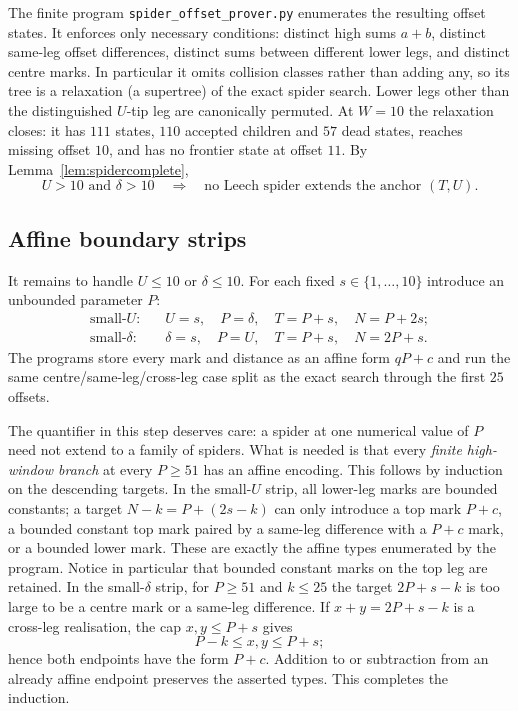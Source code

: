 \documentclass[11pt,a4paper]{article}
\theoremstyle{plain}
\theoremstyle{remark}
\newcommand{\file}[1]{\texttt{#1}}
\begin{document}
The finite program \file{spider\_offset\_prover.py} enumerates the resulting
offset states.  It enforces only necessary conditions: distinct high sums
$a+b$, distinct same-leg offset differences, distinct sums between different
lower legs, and distinct centre marks.  In particular it omits collision
classes rather than adding any, so its tree is a relaxation (a supertree) of
the exact spider search.  Lower legs other than the distinguished $U$-tip leg
are canonically permuted.  At $W=10$ the relaxation closes: it has $111$ states,
$110$ accepted children and $57$ dead states, reaches missing offset $10$, and
has no frontier state at offset $11$.  By Lemma~\ref{lem:spidercomplete},
\begin{equation}\label{eq:regularclosed}
  U>10\text{ and }\delta>10 \quad\Longrightarrow\quad
  \text{no Leech spider extends the anchor }(T,U).
\end{equation}

\subsection{Affine boundary strips}

It remains to handle $U\le10$ or $\delta\le10$.  For each fixed
$s\in\{1,\ldots,10\}$ introduce an unbounded parameter $P$:
\begin{align*}
\text{small-$U$:}&\quad U=s,\quad P=\delta,\quad T=P+s,\quad N=P+2s;\\
\text{small-$\delta$:}&\quad \delta=s,\quad P=U,\quad T=P+s,\quad N=2P+s.
\end{align*}
The programs store every mark and distance as an affine form $qP+c$ and run the
same centre/same-leg/cross-leg case split as the exact search through the first
$25$ offsets.

The quantifier in this step deserves care: a spider at one numerical value of
$P$ need not extend to a family of spiders.  What is needed is that every
\emph{finite high-window branch} at every $P\ge51$ has an affine encoding.
This follows by induction on the descending targets.  In the small-$U$ strip,
all lower-leg marks are bounded constants; a target $N-k=P+(2s-k)$ can only
introduce a top mark $P+c$, a bounded constant top mark paired by a same-leg
difference with a $P+c$ mark, or a bounded lower mark.  These are exactly the
affine types enumerated by the program.  Notice in particular that bounded
constant marks on the top leg are retained.  In the small-$\delta$ strip, for
$P\ge51$ and $k\le25$ the target $2P+s-k$ is too large to be a centre mark or a
same-leg difference.  If $x+y=2P+s-k$ is a cross-leg realisation, the cap
$x,y\le P+s$ gives
\[
   P-k\le x,y\le P+s;
\]
hence both endpoints have the form $P+c$.  Addition to or subtraction from an
already affine endpoint preserves the asserted types.  This completes the
induction.
\end{document}
